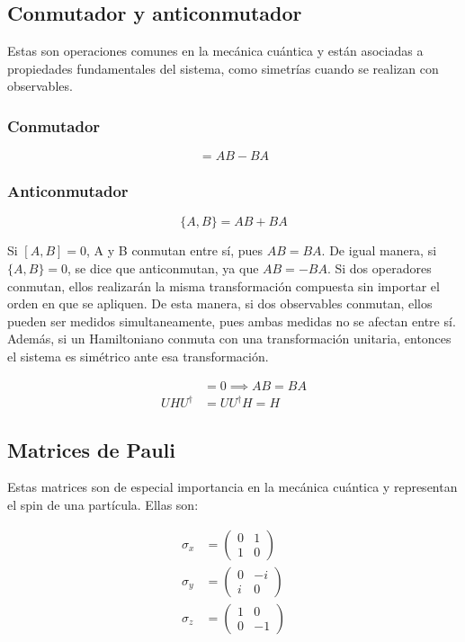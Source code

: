 \subsection{Conmutador y anticonmutador}

Estas son operaciones comunes en la mecánica cuántica y están asociadas a propiedades fundamentales del sistema, como simetrías cuando se realizan con observables.

\subsubsection{Conmutador}

\begin{equation}
    [A,B] = A B - B A
\end{equation}

\subsubsection{Anticonmutador}

\begin{equation}
    \{A,B\} = A B + B A
\end{equation}

Si $[A,B] = 0$, A y B conmutan entre sí, pues $AB = BA$. De igual manera, si $\{A,B\} = 0$, se dice que anticonmutan, ya que $AB = -BA$. Si dos operadores conmutan, ellos realizarán la misma transformación compuesta sin importar el orden en que se apliquen. De esta manera, si dos observables conmutan, ellos pueden ser medidos simultaneamente, pues ambas medidas no se afectan entre sí. Además, si un Hamiltoniano conmuta con una transformación unitaria, entonces el sistema es simétrico ante esa transformación.

\begin{align*}
    [A,B] &= 0 \implies A B = B A \\
    U H U^\dagger &= U U^\dagger H = H
\end{align*}


\subsection{Matrices de Pauli}

Estas matrices son de especial importancia en la mecánica cuántica y representan el spin de una partícula. Ellas son:

\begin{align}
    \sigma_x &=
        \begin{pmatrix}
            0 & 1 \\
            1 & 0
        \end{pmatrix} \\
    \sigma_y &=
        \begin{pmatrix}
            0 & -i \\
            i & 0
        \end{pmatrix} \\
    \sigma_z &=
        \begin{pmatrix}
            1 & 0 \\
            0 & -1
        \end{pmatrix}
\end{align}

